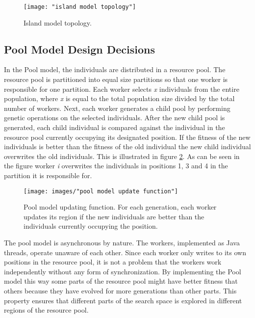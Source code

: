 \begin{figure}
    \begin{center}
        \texttt{[image: "island model topology"]}
        \caption{Island model topology.}
        \label{figure:topology island model}
    \end{center}
\end{figure}


\subsection{Pool Model Design Decisions}


\noindent In the Pool model, the individuals are distributed in a resource pool. The resource pool is partitioned into equal size partitions so that one worker is responsible for one partition. Each worker selects \textit{x} individuals from the entire population, where \textit{x} is equal to the total population size divided by the total number of workers. Next, each worker generates a child pool by performing genetic operations on the selected individuals. After the new child pool is generated, each child individual is compared against the individual in the resource pool currently occupying its designated position. If the fitness of the new individuals is better than the fitness of the old individual the new child individual overwrites the old individuals. This is illustrated in figure \ref{figure:pool model update function}. As can be seen in the figure worker \textit{i} overwrites the individuals in positions 1, 3 and 4 in the partition it is responsible for.\\


\begin{figure}[h!]
\begin{center}
\texttt{[image: images/"pool model update function"]}
\caption{Pool model updating function. For each generation, each worker updates its region if the new individuals are better than the individuals currently occupying the position.}
\label{figure:pool model update function}
\end{center}
\end{figure}


\noindent The pool model is asynchronous by nature. The workers, implemented as Java threads, operate unaware of each other. Since each worker only writes to its own positions in the resource pool, it is not a problem that the workers work independently without any form of synchronization. By implementing the Pool model this way some parts of the resource pool might have better fitness that others because they have evolved for more generations than other parts. This property ensures that different parts of the search space is explored in different regions of the resource pool. \\


